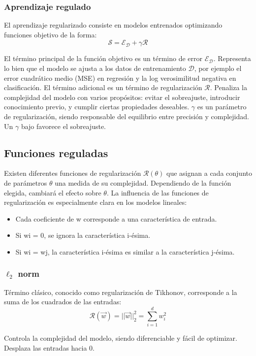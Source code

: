 \subsubsection{Aprendizaje regulado}
El aprendizaje regularizado consiste en modelos entrenados optimizando funciones objetivo de la forma:
$$\mathcal{S} = \mathcal{E_D} + \gamma \mathcal{R}$$

El término principal de la función objetivo es un término de error $\mathcal{E_D}$. Representa lo bien que el modelo se ajusta a los datos de entrenamiento $\mathcal{D}$, por ejemplo el error cuadrático medio (MSE) en regresión y la log verosimilitud negativa en clasificación. El término adicional es un término de regularización $\mathcal{R}$. Penaliza la complejidad del modelo con varios propósitos: evitar el sobreajuste, introducir conocimiento previo, y cumplir ciertas propiedades deseables. $\gamma$ es un parámetro de regularización, siendo responsable del equilibrio entre precisión y complejidad. Un $\gamma$ bajo favorece el sobreajuste. 

\subsection{Funciones reguladas}
Existen diferentes funciones de regularización $\mathcal{R}(\theta)$ que asignan a cada conjunto de parámetros $\theta$ una medida de su complejidad. Dependiendo de la función elegida, cambiará el efecto sobre $\theta$. La influencia de las funciones de regularización es especialmente clara en los modelos lineales:
\begin{itemize}
\item Cada coeficiente de w corresponde a una característica de entrada.
\item Si wi = 0, se ignora la característica i-ésima.
\item Si wi = wj, la característica i-ésima es similar a la característica j-ésima.
\end{itemize}

\subsubsection{$\ell_2$ norm}
Término clásico, conocido como regularización de Tikhonov, corresponde a la suma de los cuadrados de las entradas:
$$\mathcal{R}(\vec{w}) = ||\vec{w}||^2_2 = \sum^d_{i=1} w_i^2$$

Controla la complejidad del modelo, siendo diferenciable y fácil de optimizar. Desplaza las entradas hacia 0.

